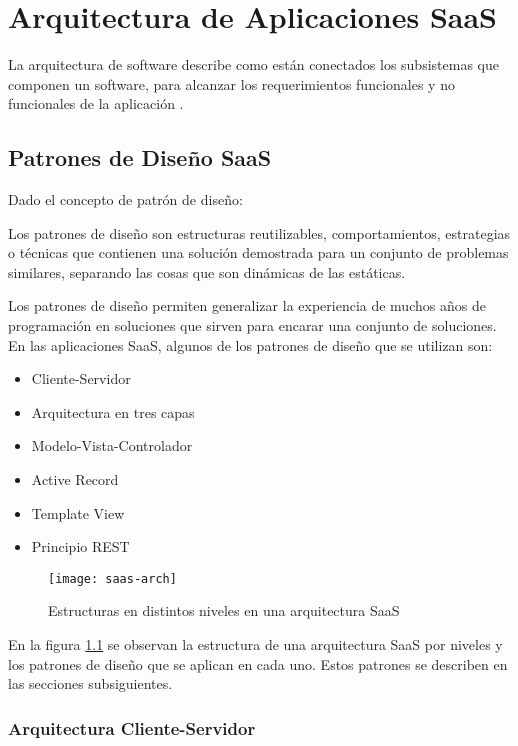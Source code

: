 \chapter{Arquitectura de Aplicaciones SaaS}
La arquitectura de software describe como están conectados los subsistemas que componen un software, para alcanzar los requerimientos funcionales y no funcionales de la aplicación \cite{Fox2013-ct}.

\section{Patrones de Diseño SaaS} 
Dado el concepto de patrón de diseño:
\begin{displayquote}
Los patrones de diseño son estructuras reutilizables, comportamientos, estrategias o técnicas que contienen una solución demostrada para un conjunto de problemas similares, separando las cosas que son dinámicas de las estáticas.
\cite{Fox2013-ct}
\end{displayquote}
    
    Los patrones de diseño permiten generalizar la experiencia de muchos años de programación en soluciones que sirven para encarar una conjunto de soluciones. 
    En las aplicaciones SaaS, algunos de los patrones de diseño que se utilizan son:
\begin{itemize}
    \item Cliente-Servidor
    \item Arquitectura en tres capas
    \item Modelo-Vista-Controlador
    \item Active Record
    \item Template View
    \item Principio REST
\end{itemize}


    \begin{figure}[H]
        \centering
        \texttt{[image: saas-arch]}
        \caption{Estructuras en distintos niveles en una arquitectura SaaS \protect\cite{Fox2013-ct}}
        \label{fig:saas-arch}
    \end{figure}

En la figura \ref{fig:saas-arch} se observan la estructura de una arquitectura SaaS por niveles y los patrones de diseño que se aplican en cada uno. Estos patrones se describen en las secciones subsiguientes.
\subsection{Arquitectura Cliente-Servidor}
    
